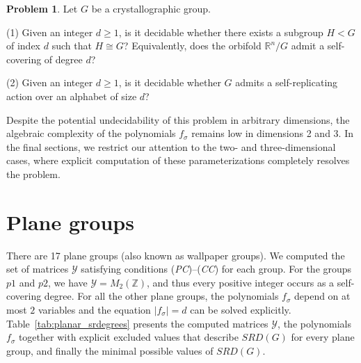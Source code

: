 \documentclass[draft]{adm-paper}
\theoremstyle{definition}
\newtheorem{problem}{Problem}
\begin{document}
\begin{problem}
Let $G$ be a crystallographic group.

(1) Given an integer $d\geq 1$, is it decidable whether there exists a subgroup $H < G$ of index $d$ such that $H \cong G$? Equivalently, does the orbifold $\mathbb{R}^n/G$ admit a self-covering of degree $d$?

(2) Given an integer $d\geq 1$, is it decidable whether $G$ admits a self-replicating action over an alphabet of size $d$?
\end{problem}

Despite the potential undecidability of this problem in arbitrary dimensions, the algebraic complexity of the
polynomials $f_\sigma$ remains low in dimensions 2 and 3. In the final sections, we restrict our attention to the
two- and three-dimensional cases, where explicit computation of these parameterizations completely resolves the
problem.



\section{Plane groups}\label{sec:planar}

There are 17 plane groups (also known as wallpaper groups). We computed the set of matrices $\mathcal{Y}$ satisfying
conditions (\textit{PC})--(\textit{CC}) for each group. For the groups $p1$ and $p2$, we have
$\mathcal{Y}=M_2(\mathbb{Z})$, and thus every positive integer occurs as a self-covering degree.
For all the other plane groups, the polynomials $f_\sigma$ depend on at most $2$ variables and the equation
$|f_\sigma| = d$ can be solved explicitly. Table~\ref{tab:planar_srdegrees} presents the computed matrices
$\mathcal{Y}$, the polynomials $f_\sigma$ together with explicit excluded values that describe $SRD(G)$ for every
plane group, and finally the minimal possible values of $SRD(G)$.

\end{document}
